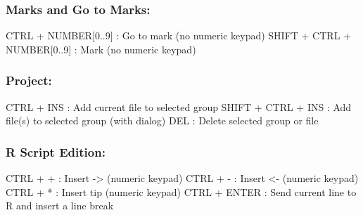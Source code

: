 \subsubsection{Marks and Go to Marks:}

\vspace{-0.5cm}
\begin{Rtables}[caption={[Marks and go to marks keyboard shortcuts]
    Marks and go to marks keyboard shortcuts},
  label=hotkey:marks]
  CTRL  + NUMBER[0..9]        : Go to mark (no numeric keypad)
  SHIFT + CTRL + NUMBER[0..9] : Mark (no numeric keypad)
\end{Rtables}


\subsubsection{Project:}

\vspace{-0.5cm}
\begin{Rtables}[caption={[Project keyboard shortcuts]
    Project keyboard shortcuts},
  label=hotkey:project]
  CTRL  + INS             : Add current file to selected group
  SHIFT + CTRL + INS      : Add file(s) to selected group (with dialog)
  DEL                     : Delete selected group or file
\end{Rtables}


\subsubsection{R Script Edition:}

\vspace{-0.5cm}
\begin{Rtables}[caption={[R script edition keyboard shortcuts]
    R script edition keyboard shortcuts},
  label=hotkey:rscript]
  CTRL + +                : Insert ->  (numeric keypad)
  CTRL + -                : Insert <-  (numeric keypad)
  CTRL + *                : Insert tip (numeric keypad)
  CTRL + ENTER            : Send current line to R and insert a line break
\end{Rtables}



